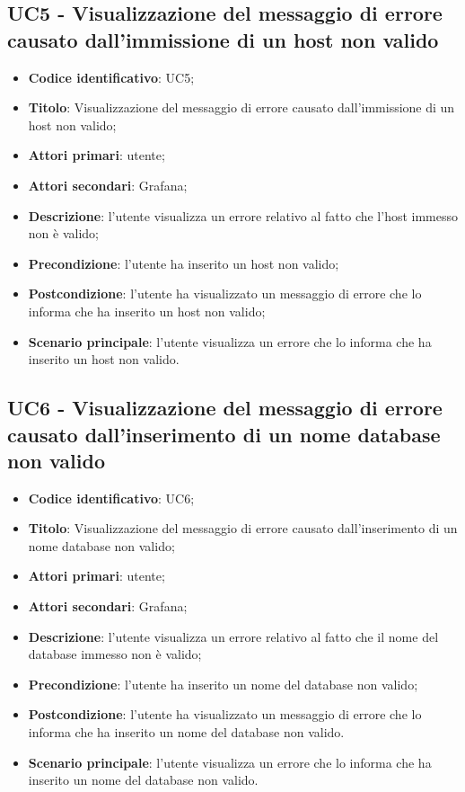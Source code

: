 \subsection{UC5 - Visualizzazione del messaggio di errore causato dall'immissione di un host non valido}
\begin{itemize}
	\item \textbf{Codice identificativo}: UC5;
	\item \textbf{Titolo}: Visualizzazione del messaggio di errore causato dall'immissione di un host non valido;
	\item \textbf{Attori primari}: utente;
	\item \textbf{Attori secondari}: Grafana\glo;
	\item \textbf{Descrizione}: l'utente visualizza un errore relativo al fatto che l'host immesso non è valido;
	\item \textbf{Precondizione}: l'utente ha inserito un host non valido;
	\item \textbf{Postcondizione}: l'utente ha visualizzato un messaggio di errore che lo informa che ha inserito un host non 		valido;
	\item \textbf{Scenario principale}: l'utente visualizza un errore che lo informa che ha inserito un host non valido.

\end{itemize}
		
\subsection{UC6 - Visualizzazione del messaggio di errore causato dall'inserimento di un nome database non valido}
\begin{itemize}
	\item \textbf{Codice identificativo}: UC6;
	\item \textbf{Titolo}: Visualizzazione del messaggio di errore causato dall'inserimento di un nome database non valido;
	\item \textbf{Attori primari}: utente;
	\item \textbf{Attori secondari}: Grafana\glo;
	\item \textbf{Descrizione}: l'utente visualizza un errore relativo al fatto che il nome del database immesso non è valido;
	\item \textbf{Precondizione}: l'utente ha inserito un nome del database non valido;
	\item \textbf{Postcondizione}: l'utente ha visualizzato un messaggio di errore che lo informa che ha inserito un nome del 		database non valido.
	\item \textbf{Scenario principale}: l'utente visualizza un errore che lo informa che ha inserito un nome del database non 		valido.
\end{itemize}
		
